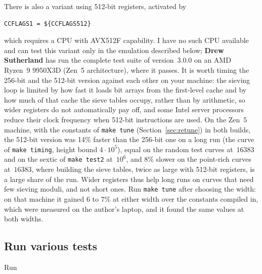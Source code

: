 \documentclass[12pt,a4paper,oneside]{amsart}
\begin{document}
There is also a variant using 512-bit registers, activated by
\begin{verbatim}
CCFLAGS1 = ${CCFLAGS512}
\end{verbatim}
which requires a CPU with AVX512F capability. I have no such CPU available
and can test this variant only in the emulation described below;
\textbf{Drew Sutherland} has run the complete test suite of version~3.0.0 on
an AMD Ryzen~9 9950X3D (Zen~5 architecture), where it passes. It is worth
timing the 256-bit and the 512-bit version against each other on your
machine: the sieving loop is limited by how fast it loads bit arrays from the
first-level cache and by how much of that cache the sieve tables occupy,
rather than by arithmetic, so wider registers do not automatically pay off,
and some Intel server processors reduce their clock frequency when 512-bit
instructions are used. On the Zen~5 machine, with the constants of
\texttt{make tune} (Section~\ref{sec:retune}) in both builds, the 512-bit
version was 14\% faster than the 256-bit one on a long run (the curve of
\texttt{make timing}, height bound $4\cdot10^5$), equal on the random test
curves at~$16383$ and on the sextic of \texttt{make test2} at~$10^6$, and
8\% slower on the point-rich curves at~$16383$, where building the sieve
tables, twice as large with 512-bit registers, is a large share of the run.
Wider registers thus help long runs on curves that need few sieving moduli,
and not short ones. Run \texttt{make tune} after choosing the width: on that
machine it gained 6 to 7\% at either width over the constants compiled in,
which were measured on the author's laptop, and it found the same values at
both widths.


\subsection{Run various tests}\label{sec:tests}

Run
\end{document}

